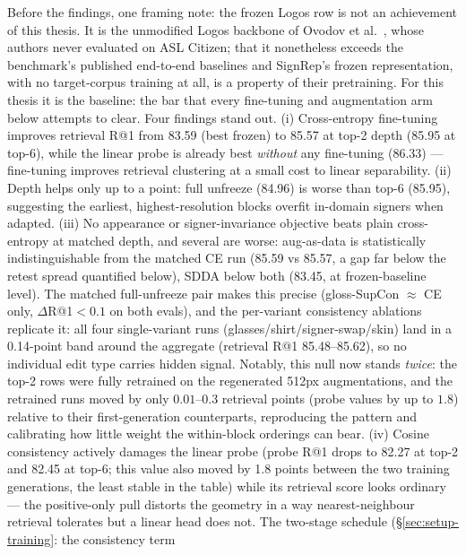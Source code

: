 Before the findings, one framing note: the frozen Logos row is not an
achievement of this thesis. It is the unmodified Logos backbone of
Ovodov et al.~\cite{ovodovLogosWellTemperedPretrain2025}, whose authors
never evaluated on ASL Citizen; that it nonetheless exceeds the
benchmark's published end-to-end baselines and SignRep's frozen
representation, with no target-corpus training at all, is a property of
their pretraining. For this thesis it is the baseline: the bar that
every fine-tuning and augmentation arm below attempts to clear.
Four findings stand out. (i) Cross-entropy fine-tuning improves retrieval R@1
from 83.59 (best frozen) to 85.57 at top-2 depth (85.95 at top-6), while
the linear probe is already best \emph{without} any fine-tuning (86.33) ---
fine-tuning improves retrieval clustering at a small cost to linear
separability. (ii) Depth helps only up to a point: full unfreeze (84.96)
is worse than top-6 (85.95), suggesting the earliest, highest-resolution
blocks overfit in-domain signers when adapted. (iii) No appearance or
signer-invariance objective beats plain cross-entropy at matched depth,
and several are worse: aug-as-data is statistically indistinguishable
from the matched CE run (85.59 vs 85.57, a gap far below the retest
spread quantified below), SDDA below both (83.45, at
frozen-baseline level). The
matched full-unfreeze pair makes this precise
(gloss-SupCon $\approx$ CE only, $\Delta$R@1$<0.1$ on both evals),
and the per-variant consistency ablations replicate it: all four
single-variant runs (glasses/shirt/signer-swap/skin) land in a 0.14-point
band around the aggregate (retrieval R@1 85.48--85.62), so no individual edit
type carries hidden signal. Notably, this null now stands \emph{twice}:
the top-2 rows were fully retrained on the regenerated 512px
augmentations, and the retrained runs moved by only $0.01$--$0.3$
retrieval points (probe values by up to $1.8$) relative to their
first-generation counterparts, reproducing the pattern and calibrating
how little weight the within-block orderings can bear. (iv) Cosine consistency actively damages the
linear probe (probe R@1 drops to 82.27 at top-2 and 82.45 at top-6;
this value also moved by 1.8 points between the two training
generations, the least stable in the table) while its retrieval score
looks ordinary --- the positive-only pull distorts the geometry in a way
nearest-neighbour retrieval tolerates but a linear head does not. The
two-stage schedule (\S\ref{sec:setup-training}: the consistency term
